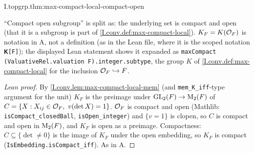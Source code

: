 \begin{theorem}
\end{theorem}
\begin{tfformal}{I.topgrp.thm:max-compact-local-compact-open}
\begin{tffidelity}
``Compact open subgroup'' is split as: the underlying set is compact and open (that it is a subgroup is part of \cref{I.conv.def:max-compact-local}). $K_F=K(\mathcal{O}_F)$ is notation in A, not a definition (as in the Lean file, where it is the scoped notation \texttt{𝐊[F]}); the displayed Lean statement shows it expanded as \texttt{maxCompact (ValuativeRel.valuation F).integer.subtype}, the group $K$ of \cref{I.conv.def:max-compact-local} for the inclusion $\mathcal{O}_F\hookrightarrow F$.
\end{tffidelity}
\end{tfformal}
\begin{proof}[Lean proof]
By \cref{I.conv.lem:max-compact-local-mem} (and \texttt{mem\_K\_iff}-type argument for the unit) $K_F$ is the preimage under $\mathrm{GL}_2(F)\to\mathrm{M}_2(F)$ of $C=\{X: X_{ij}\in\mathcal{O}_F,\ v(\det X)=1\}$. $\mathcal{O}_F$ is compact and open (Mathlib: \texttt{isCompact\_closedBall}, \texttt{isOpen\_integer}) and $\{v=1\}$ is clopen, so $C$ is compact and open in $\mathrm{M}_2(F)$, and $K_F$ is open as a preimage. Compactness: $C\subseteq\{\det\neq0\}$ is the image of $K_F$ under the open embedding, so $K_F$ is compact (\texttt{IsEmbedding.isCompact\_iff}). As in A.
\end{proof}



